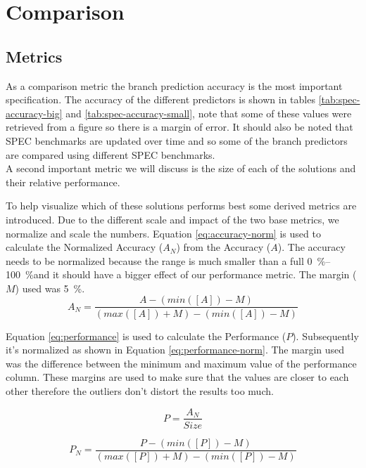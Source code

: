 
\section{Comparison}
\subsection{Metrics}
As a comparison metric the branch prediction accuracy is the most important specification. The accuracy of the different predictors is shown in tables \ref{tab:spec-accuracy-big} and \ref{tab:spec-accuracy-small}, note that some of these values were retrieved from a figure so there is a margin of error.
It should also be noted that SPEC benchmarks are updated over time and so some of the branch predictors are compared using different SPEC benchmarks.\\
A second important metric we will discuss is the size of each of the solutions and their relative performance.

To help visualize which of these solutions performs best some derived metrics are introduced.
Due to the different scale and impact of the two base metrics, we normalize and scale the numbers.
Equation \ref{eq:accuracy-norm} is used to calculate the Normalized Accuracy ($A_N$) from the Accuracy ($A$).
The accuracy needs to be normalized because the range is much smaller than a full \SIrange{0}{100}{\percent}and it should have a bigger effect of our performance metric.
The margin ($M$) used was \SI{5}{\percent}.
\begin{equation}
\label{eq:accuracy-norm}
A_{N} = \frac{A - (min([A]) - M)}{(max([A]) + M)-(min([A]) - M)}
\end{equation}

Equation \ref{eq:performance} is used to calculate the Performance ($P$).
Subsequently it's normalized as shown in Equation \ref{eq:performance-norm}.
The margin used was the difference between the minimum and maximum value of the performance column.
These margins are used to make sure that the values are closer to each other therefore the outliers don't distort the results too much.

\begin{equation}
\label{eq:performance}
P = \frac{A_{N}}{Size}
\end{equation}

\begin{equation}
\label{eq:performance-norm}
P_{N} = \frac{P - (min([P]) - M)}{(max([P]) + M)-(min([P]) - M)}
\end{equation}


